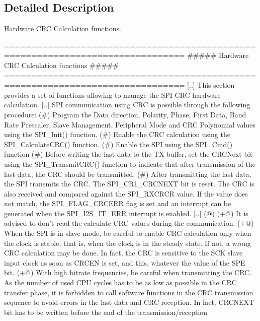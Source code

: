 \subsection{Detailed Description}
Hardware C\-R\-C Calculation functions. \begin{DoxyVerb} ===============================================================================
                  ##### Hardware CRC Calculation functions #####
 ===============================================================================  
    [..] This section provides a set of functions allowing to manage the SPI CRC hardware 
         calculation.
    [..] SPI communication using CRC is possible through the following procedure:
         (#) Program the Data direction, Polarity, Phase, First Data, Baud Rate Prescaler, 
             Slave Management, Peripheral Mode and CRC Polynomial values using the SPI_Init()
             function.
         (#) Enable the CRC calculation using the SPI_CalculateCRC() function.
         (#) Enable the SPI using the SPI_Cmd() function
         (#) Before writing the last data to the TX buffer, set the CRCNext bit using the 
             SPI_TransmitCRC() function to indicate that after transmission of the last 
             data, the CRC should be transmitted.
         (#) After transmitting the last data, the SPI transmits the CRC. The SPI_CR1_CRCNEXT
             bit is reset. The CRC is also received and compared against the SPI_RXCRCR 
             value. 
             If the value does not match, the SPI_FLAG_CRCERR flag is set and an interrupt
             can be generated when the SPI_I2S_IT_ERR interrupt is enabled.
    [..]
    (@)
         (+@) It is advised to don't read the calculate CRC values during the communication.
         (+@) When the SPI is in slave mode, be careful to enable CRC calculation only 
              when the clock is stable, that is, when the clock is in the steady state. 
              If not, a wrong CRC calculation may be done. In fact, the CRC is sensitive 
              to the SCK slave input clock as soon as CRCEN is set, and this, whatever 
              the value of the SPE bit.
         (+@) With high bitrate frequencies, be careful when transmitting the CRC.
              As the number of used CPU cycles has to be as low as possible in the CRC 
              transfer phase, it is forbidden to call software functions in the CRC 
              transmission sequence to avoid errors in the last data and CRC reception. 
              In fact, CRCNEXT bit has to be written before the end of the transmission/reception 

\end{DoxyVerb}
